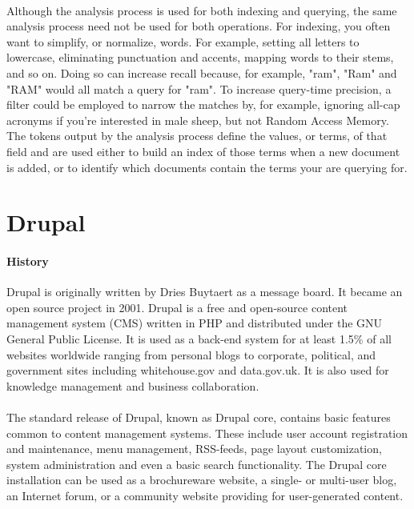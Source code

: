 \paragraph{}
Although the analysis process is used for both indexing and querying, the same analysis process need not be used for both operations. For indexing, you often want to simplify, or normalize, words. For example, setting all letters to lowercase, eliminating punctuation and accents, mapping words to their stems, and so on. Doing so can increase recall because, for example, "ram", "Ram" and "RAM" would all match a query for "ram". To increase query-time precision, a filter could be employed to narrow the matches by, for example, ignoring all-cap acronyms if you're interested in male sheep, but not Random Access Memory. The tokens output by the analysis process define the values, or terms, of that field and are used either to build an index of those terms when a new document is added, or to identify which documents contain the terms your are querying for.

\section{Drupal}
\paragraph{History}
Drupal is originally written by Dries Buytaert as a message board. It became an open source project in 2001. Drupal is a free and open-source content management system (CMS) written in PHP and distributed under the GNU General Public License. It is used as a back-end system for at least 1.5\% of all websites worldwide ranging from personal blogs to corporate, political, and government sites including whitehouse.gov and data.gov.uk. It is also used for knowledge management and business collaboration.

\paragraph{}
The standard release of Drupal, known as Drupal core, contains basic features common to content management systems. These include user account registration and maintenance, menu management, RSS-feeds, page layout customization, system administration and even a basic search functionality. The Drupal core installation can be used as a brochureware website, a single- or multi-user blog, an Internet forum, or a community website providing for user-generated content.

